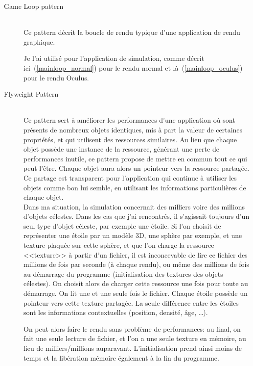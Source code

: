 \documentclass[a4paper,french,12pt]{article}
\begin{document}
\begin{description}
	    \item [Game Loop pattern]~\\
		Ce pattern décrit la boucle de rendu typique d'une application de rendu graphique.
		
		Je l'ai utilisé pour l'application de simulation, comme décrit ici~(\ref{mainloop_normal}) pour le rendu normal
		et là~(\ref{mainloop_oculus}) pour le rendu Oculus.
	    
	    \item [Flyweight Pattern]~\\
	      Ce pattern sert à améliorer les performances d'une application où sont présents de nombreux objets identiques,
	      mis à part la valeur de certaines propriétés, et qui utilisent des ressources similaires.
	      Au lieu que chaque objet possède une instance de la ressource, générant une perte de performances
	      inutile, ce pattern propose de mettre en commun tout ce qui peut l'être. Chaque objet aura alors un pointeur
	      vers la ressource partagée. Ce partage est transparent pour l'application qui continue à utiliser les objets 
	      comme bon lui semble, en utilisant les informations particulières de chaque objet.\\
	      
	      Dans ma situation, la simulation concernait des milliers voire des millions d'objets célestes. Dans les cas que j'ai
	      rencontrés, il s'agissait toujours d'un seul type d'objet céleste, par exemple une étoile.
	      Si l'on choisit de représenter une étoile par un modèle 3D, une sphère par exemple, et une
	      texture plaquée sur cette sphère, et que l'on charge la ressource <<texture>> à partir d'un fichier, il est inconcevable
	      de lire ce fichier des millions de fois par seconde (à chaque rendu), ou même des millions de fois au démarrage du
	      programme (initialisation des textures des objets célestes).
	      On choisit alors de charger cette ressource une fois pour toute au démarrage. On lit une et une seule fois le fichier.
	      Chaque étoile possède un pointeur vers cette texture partagée. 
	      La seule différence entre les étoiles sont les informations contextuelles (position, densité, âge, \ldots).
	      
	      On peut alors faire le rendu sans problème de performances: au final, on fait une seule lecture de fichier, et
	      l'on a une seule texture en mémoire, au lieu de milliers/millions auparavant.
	      L'initialisation prend ainsi moins de temps et la libération mémoire également à la fin du programme.
	      

\end{description}
\end{document}

